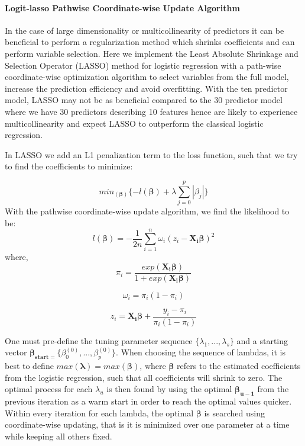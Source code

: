 \documentclass[]{article}
\let\oldparagraph\paragraph
\renewcommand{\paragraph}[1]{\oldparagraph{#1}\mbox{}}
\begin{document}
\hypertarget{logit-lasso-pathwise-coordinate-wise-update-algorithm}{%
\paragraph{Logit-lasso Pathwise Coordinate-wise Update
Algorithm}\label{logit-lasso-pathwise-coordinate-wise-update-algorithm}}

In the case of large dimensionality or multicollinearity of predictors
it can be beneficial to perform a regularization method which shrinks
coefficients and can perform variable selection. Here we implement the
Least Absolute Shrinkage and Selection Operator (LASSO) method for
logistic regression with a path-wise coordinate-wise optimization
algorithm to select variables from the full model, increase the
prediction efficiency and avoid overfitting. With the ten predictor
model, LASSO may not be as beneficial compared to the 30 predictor model
where we have 30 predictors describing 10 features hence are likely to
experience multicollinearity and expect LASSO to outperform the
classical logistic regression.

In LASSO we add an L1 penalization term to the loss function, such that
we try to find the coefficients to minimize:

\[min _{(\boldsymbol \beta)}\{-l({\boldsymbol \beta})+\lambda\sum_{j=0}^{p}|\beta_j| \}\]
With the pathwise coordinate-wise update algorithm, we find the
likelihood to be:
\[l({\boldsymbol \beta}) = -\frac{1}{2n}\sum_{i=1}^{n}\omega_i(z_i-{\boldsymbol {X_i\beta}})^2\]
where,
\[\pi_i = \frac{exp({\boldsymbol {X_i\beta}})}{1+exp({\boldsymbol {X_i\beta}})}\]

\[\omega_i = \pi_i(1-\pi_i)\]

\[z_i = {\boldsymbol {X_i\beta}}+\frac{y_i-\pi_i}{\pi_i(1-\pi_i)}\]

One must pre-define the tuning parameter sequence
\(\{\lambda_1,...,\lambda_s\}\) and a starting vector
\({\boldsymbol{\beta_{start=}}}\{\beta_0^{(0)},...,\beta_p^{(0)}\}\).
When choosing the sequence of lambdas, it is best to define
\(max{(\boldsymbol \lambda)} = max(\boldsymbol\beta)\), where
\(\boldsymbol\beta\) refers to the estimated coefficients from the
logistic regression, such that all coefficients will shrink to zero. The
optimal process for each \(\lambda_u\) is then found by using the
optimal \(\boldsymbol {\beta_{u-1}}\) from the previous iteration as a
warm start in order to reach the optimal values quicker. Within every
iteration for each lambda, the optimal \(\boldsymbol \beta\) is searched
using coordinate-wise updating, that is it is minimized over one
parameter at a time while keeping all others fixed.
\end{document}
